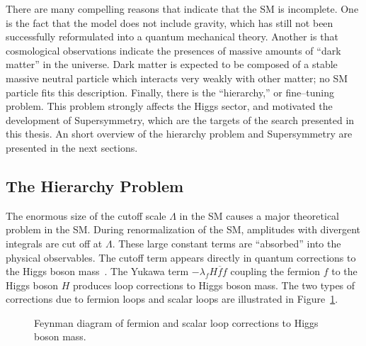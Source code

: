 There are many compelling reasons that indicate
that the SM is incomplete.  One is the fact that the model does not
include gravity, which has still not been successfully reformulated into a quantum
mechanical theory.  Another is that cosmological observations indicate the
presences of massive amounts of ``dark matter'' in the universe.  Dark matter is
expected to be composed of a stable massive neutral particle which interacts
very weakly with other matter; no SM particle fits this description.
Finally, there is the ``hierarchy,'' or fine--tuning problem.  This problem
strongly affects the Higgs sector, and motivated the development of
Supersymmetry, which are the targets of the search presented in this thesis.  An
short overview of the hierarchy problem and Supersymmetry are presented in the
next sections.

\subsection{The Hierarchy Problem}
The enormous size of the cutoff scale $\Lambda$ in the SM causes a
major theoretical problem in the SM\@.  During renormalization of the
SM, amplitudes with divergent integrals are cut off at $\Lambda$.
These large constant terms are ``absorbed'' into the physical observables.  The
cutoff term appears directly in quantum corrections to the Higgs boson
mass~\cite{Martin:1997um}.  The Yukawa term $-\lambda_f H \overline f f$
coupling the fermion $f$ to the Higgs boson $H$ produces loop corrections to Higgs
boson mass.  The two types of corrections due to fermion loops and scalar loops are
illustrated in Figure~\ref{fig:HiggsMassLoopCorrections}.
\begin{figure}
  \centering
  \hspace{15mm}
  \caption[Loop corrections to Higgs boson mass]{Feynman diagram of
  fermion  and scalar
   loop corrections to Higgs boson mass.}
  \label{fig:HiggsMassLoopCorrections}
\end{figure}
